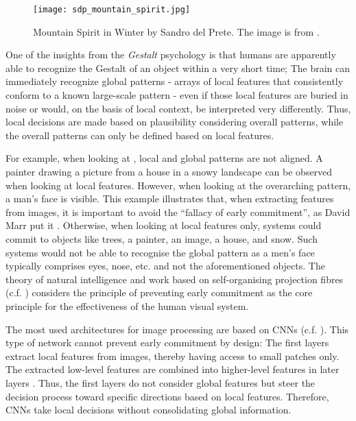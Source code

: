 \begin{figure}[h]
    \centering
    \texttt{[image: sdp\_mountain\_spirit.jpg]}
    \caption[Mountain Spirit in Winter by Sandro del Prete]{Mountain Spirit in Winter by Sandro del Prete. The image is from .}
\end{figure}

One of the insights from the \emph{Gestalt} psychology  is that humans are apparently able to recognize the Gestalt of an object within a very short time; The brain can immediately recognize global patterns - arrays of local features that consistently conform to a known large-scale pattern - even if those local features are buried in noise or would, on the basis of local context, be interpreted very differently. Thus, local decisions are made based on plausibility considering overall patterns, while the overall patterns can only be defined based on local features.

For example, when looking at , local and global patterns are not aligned. A painter drawing a picture from a house in a snowy landscape can be observed when looking at local features. However, when looking at the overarching pattern, a man's face is visible.
This example illustrates that, when extracting features from images, it is important to avoid the ``fallacy of early commitment'', as David Marr put it .
Otherwise, when looking at local features only, systems could commit to objects like trees, a painter, an image, a house, and snow. Such systems would not be able to recognise the global pattern as a men's face typically comprises eyes, nose, etc. and not the aforementioned objects.
The theory of natural intelligence  and work based on self-organising projection fibres (c.f. ) considers the principle of preventing early commitment as the core principle for the effectiveness of the human visual system.

The most used architectures for image processing are based on CNNs (c.f. ). This type of network cannot prevent early commitment by design: The first layers extract local features from images, thereby having access to small patches only. The extracted low-level features are combined into higher-level features in later layers . Thus, the first layers do not consider global features but steer the decision process toward specific directions based on local features. Therefore, CNNs take local decisions without consolidating global information.

